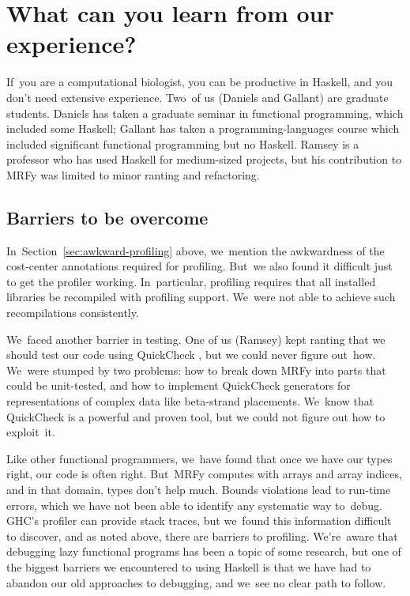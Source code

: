 \documentclass[nonatbib]{sigplanconf}
\newcommand\secref[1]{Section~\ref{sec:#1}}
\newcommand\finalremark{\remark}
\newcommand\finalremark[1]{\relax}
\let\cite\citep
\begin{document}
\section{What can you learn from our experience?}

If~you are a computational biologist, 
you can be productive in Haskell, and you don't need extensive
experience.
Two~of us (Daniels and Gallant) are graduate students.
Daniels has taken a graduate seminar in functional programming, which
included some Haskell;
Gallant has taken a programming-languages course which included
significant functional programming but no Haskell.
Ramsey is a professor who has used Haskell 
for medium-sized projects,
but his contribution to MRFy was limited to minor ranting and refactoring.


\subsection{Barriers to be overcome}

In~\secref{awkward-profiling} above, we~mention the awkwardness of the
cost-center annotations required for profiling.
But~we also found it difficult just to get the profiler working.
In~particular, profiling requires that all installed libraries be recompiled
with profiling support.
We~were not able to achieve such recompilations consistently.


We~faced another barrier in testing.
One of us (Ramsey) kept ranting that we should test our code using 
QuickCheck \cite{claessen:quickcheck},
but we could never figure out~how.
We~were stumped by two problems:
how to break down MRFy into parts that could be
unit-tested,
and how to implement QuickCheck generators for representations of complex
data like beta-strand placements.
We~know that QuickCheck is a powerful and proven tool,
but we could not figure out how to exploit~it.

Like other functional programmers, we~have found that 
once we have our types right, our code is often right.
But~MRFy computes with arrays and array indices,
and in that domain, types don't help much.
Bounds violations lead to run-time errors, which we have not been able
to identify any systematic way to~debug.
GHC's profiler can provide stack traces, but we~found this information
difficult to discover, and as noted above,
there are barriers to profiling.
We're~aware that debugging lazy functional programs has been a topic
of some research,\finalremark{Do we cite Hood, Hat, or Freya?}
but one of the biggest barriers we encountered to using Haskell is
that we have had to abandon our old approaches to debugging,
and we~see no clear path to follow.
\end{document}
